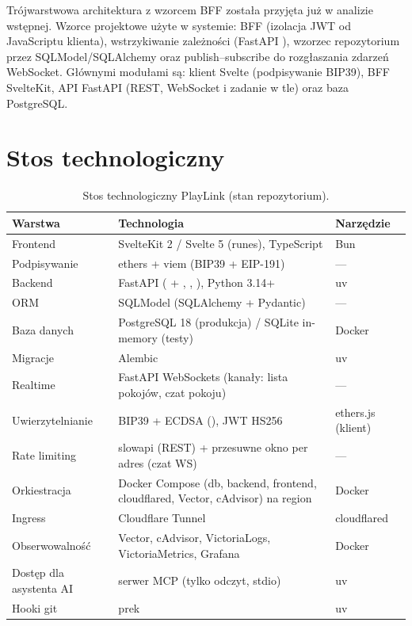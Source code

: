 Trójwarstwowa architektura z wzorcem BFF została przyjęta już w analizie wstępnej.
Wzorce projektowe użyte w systemie: BFF (izolacja JWT od JavaScriptu klienta),
wstrzykiwanie zależności (FastAPI ), wzorzec repozytorium przez
SQLModel/SQLAlchemy oraz publish--subscribe do rozgłaszania zdarzeń WebSocket.
Głównymi modułami są: klient Svelte (podpisywanie BIP39), BFF SvelteKit, API FastAPI
(REST, WebSocket i zadanie w tle) oraz baza PostgreSQL.


\section{Stos technologiczny}
\label{sec:arch-stos}

\begin{table}[H]
\centering\small
\renewcommand{\arraystretch}{1.2}
\begin{tabularx}{\textwidth}{@{}>{\raggedright\arraybackslash}p{}Y>{\raggedright\arraybackslash}p{0.2\textwidth}@{}}
\toprule
\textbf{Warstwa} & \textbf{Technologia} & \textbf{Narzędzie} \\
\midrule
Frontend & SvelteKit 2 / Svelte 5 (runes), TypeScript & Bun \\
Podpisywanie & ethers + viem (BIP39 + EIP-191) & --- \\
Backend & FastAPI ( + , , ), Python 3.14+ & uv \\
ORM & SQLModel (SQLAlchemy + Pydantic) & --- \\
Baza danych & PostgreSQL 18 (produkcja) / SQLite in-memory (testy) & Docker \\
Migracje & Alembic & uv \\
Realtime & FastAPI WebSockets (kanały: lista pokojów, czat pokoju) & --- \\
Uwierzytelnianie & BIP39 + ECDSA (), JWT HS256 & ethers.js (klient) \\
Rate limiting & slowapi (REST) + przesuwne okno per adres (czat WS) & --- \\
Orkiestracja & Docker Compose (db, backend, frontend, cloudflared, Vector, cAdvisor) na region & Docker \\
Ingress & Cloudflare Tunnel & cloudflared \\
Obserwowalność & Vector, cAdvisor, VictoriaLogs, VictoriaMetrics, Grafana & Docker \\
Dostęp dla asystenta AI & serwer MCP (tylko odczyt, stdio) & uv \\
Hooki git & prek & uv \\
\bottomrule
\end{tabularx}
\caption{Stos technologiczny PlayLink (stan repozytorium).}
\label{tab:arch-stos}
\end{table}

